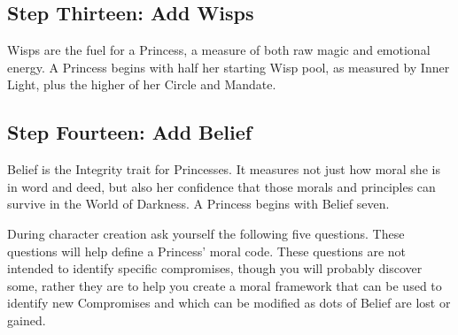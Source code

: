 \subsection*{Step Thirteen: Add Wisps}

Wisps are the fuel for a Princess, a measure of both raw magic and emotional energy. A Princess begins with half her starting Wisp pool, as measured by Inner Light, plus the higher of her Circle and Mandate.

\subsection*{Step Fourteen: Add Belief} 

Belief is the Integrity trait for Princesses. It measures not just how moral she is in word and deed, but also her confidence that those morals and principles can survive in the World of Darkness. A Princess begins with Belief seven. %

During character creation ask yourself the following five questions. These questions will help define a Princess' moral code. These questions are not intended to identify specific compromises, though you will probably discover some, rather they are to help you create a moral framework that can be used to identify new Compromises and which can be modified as dots of Belief are lost or gained.  

